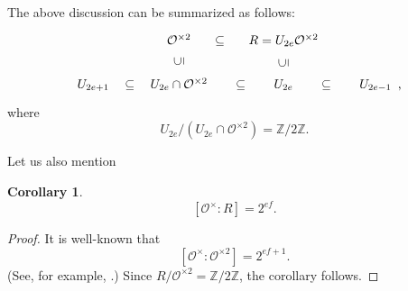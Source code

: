 \documentclass[10pt, letterpaper]{amsart}
\theoremstyle{plain}
\newtheorem{Cor}[equation]{Corollary}
\theoremstyle{definition}
\numberwithin{equation}{section}
\newcommand{\Z}{\mathbb{Z}}
\newcommand{\Ocal}{\mathcal{O}}
\begin{document}

The above discussion can be summarized as follows:
\[
\begin{tikzcd}
&\Ocal^{\times 2}\ar[r, phantom, "\subseteq"]&R=U_{2e}\Ocal^{\times 2}&\\
U_{2e+1}\ar[r, phantom, "\subseteq"]&U_{2e}\cap\Ocal^{\times 2}\ar[r, phantom, "\subseteq"]\ar[u, phantom, "{\rotatebox{90}{$\subseteq$}}"]&U_{2e}\ar[r, phantom, "\subseteq"]\ar[u, phantom, "{\rotatebox{90}{$\subseteq$}}"]&U_{2e-1}
\rlap{\, ,}
\end{tikzcd}
\]
where
\[
U_{2e}\slash (U_{2e}\cap\Ocal^{\times 2})=\Z\slash 2\Z.
\]



Let us also mention
\begin{Cor}\label{C:dimension_integral_radical}
\[
[\Ocal^{\times}:R]=2^{ef}.
\]
\end{Cor}
\begin{proof}
It is well-known that
\[
[\Ocal^\times: \Ocal^{\times 2}]=2^{ef+1}.
\]
(See, for example, \cite[(5.8) Proposition, p.142]{Neukirch}.) Since $R\slash\Ocal^{\times 2}=\Z\slash 2\Z$, the corollary follows.
\end{proof}
\end{document}
